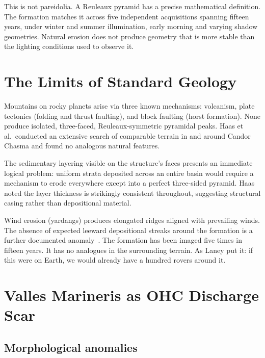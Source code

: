 \documentclass[12pt,twocolumn]{article}
\begin{document}
This is not pareidolia. A Reuleaux pyramid has a precise
mathematical definition. The formation matches it across five
independent acquisitions spanning fifteen years, under winter and
summer illumination, early morning and varying shadow geometries.
Natural erosion does not produce geometry that is more stable than
the lighting conditions used to observe it.

\section{The Limits of Standard Geology}

Mountains on rocky planets arise via three known mechanisms:
volcanism, plate tectonics (folding and thrust faulting), and block
faulting (horst formation). None produce isolated, three-faced,
Reuleaux-symmetric pyramidal peaks. Haas et al.\ conducted an
extensive search of comparable terrain in and around Candor Chasma
and found no analogous natural features.

The sedimentary layering visible on the structure's faces presents
an immediate logical problem: uniform strata deposited across an
entire basin would require a mechanism to erode everywhere except
into a perfect three-sided pyramid. Haas noted the layer thickness
is strikingly consistent throughout, suggesting structural casing
rather than depositional material.

Wind erosion (yardangs) produces elongated ridges aligned with
prevailing winds. The absence of expected leeward depositional
streaks around the formation is a further documented
anomaly~\cite{Haas2017}. The formation has been imaged five times
in fifteen years. It has no analogues in the surrounding terrain.
As Laney put it: if this were on Earth, we would already have
a hundred rovers around it.

\section{Valles Marineris as OHC Discharge Scar}

\subsection{Morphological anomalies}
\end{document}
